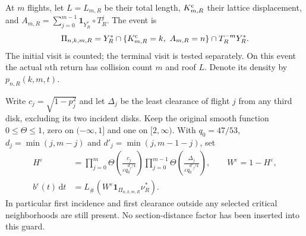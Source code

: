 \documentclass[11pt,reqno]{amsart}
\numberwithin{equation}{section}
\theoremstyle{definition}\newtheorem{definition}[theorem]{Definition}
\theoremstyle{remark}\newtheorem{remark}[theorem]{Remark}
\newcommand{\dd}{\,\mathrm d}\newcommand{\one}{\mathbf1}
\theoremstyle{definition}\newtheorem{inputstatement}[theorem]{Input statement}
\begin{document}
At $m$ flights, let $L=L_{m,R}$ be their total length,
$K^{\rm c}_{m,R}$ their lattice displacement, and
$A_{m,R}=\sum_{j=0}^{m-1}\one_{Y_R^*}\circ T_R^j$. The event is
\begin{equation}\label{eq:v76-event}
 \Pi_{n,k,m,R}=Y_R^*\cap\{K^{\rm c}_{m,R}=k,\ A_{m,R}=n\}
                         \cap T_R^{-m}Y_R^*.
\end{equation}
The initial visit is counted; the terminal visit is tested separately.
On this event the actual $n$th return has collision count $m$ and
roof $L$. Denote its density by $p_{n,R}(k,m,t)$.

Write $c_j=\sqrt{1-p_j^2}$ and let $\Delta_j$ be the least clearance
of flight $j$ from any third disk, excluding its two incident disks.
Keep the original smooth function $0\le\Theta\le1$, zero on
$(-\infty,1]$ and one on $[2,\infty)$. With $q_0=47/53$,
$d_j=\min(j,m-j)$ and $d'_j=\min(j,m-1-j)$, set
\begin{align}
 H^\varepsilon&=
 \prod_{j=0}^{m}\Theta\!\left(\frac{c_j}{\varepsilon q_0^{d_j/4}}\right)
 \prod_{j=0}^{m-1}\Theta\!\left(\frac{\Delta_j}{\varepsilon q_0^{d'_j/4}}\right),
 \qquad W^\varepsilon=1-H^\varepsilon,\label{eq:v76-guard}\\
 b^\varepsilon(t)\dd t
   &=L_\#(W^\varepsilon\one_{\Pi_{n,k,m,R}}\nu_R^*).
 \label{eq:v76-source}
\end{align}
In particular first incidence and first clearance outside any selected
critical neighborhoods are still present. No section-distance factor
has been inserted into this guard.
\end{document}
